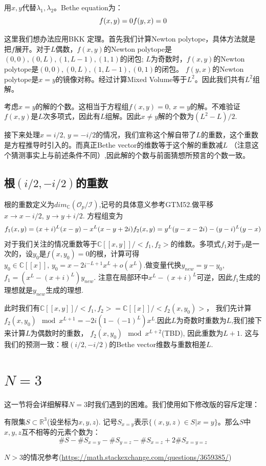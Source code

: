 用$x,y$代替$\lambda_1,\lambda_2$。Bethe equation为：\[f(x,y)=0\\f(y,x)=0\]

这里我们想办法应用BKK 定理。首先我们计算Newton polytope，具体方法就是把$f$展开。对于$L$偶数，$f(x,y)$的Newton polytope是$(0,0),(0,L),(1,L-1),(1,1)$的闭包; $L$为奇数时，$f(x,y)$的Newton polytope是$(0,0),(0,L),(1,L-1),(0,1)$的闭包。
$f(y,x)$的Newton polytope是$x=y$的镜像对称。经过计算Mixed Volume等于$L^2$。因此我们共有$L^2$组解。

考虑$x=y$的解的个数。这相当于方程组$f(x,y)=0,\,x=y$的解。不难验证$f(x,y)$是$L$次多项式，因此有$L$组解。因此$x\not=y$解的个数为$(L^2-L)/2$.

接下来处理$x=i/2,\,y=-i/2$的情况，我们宣称这个解自带了$L$的重数，这个重数是方程推导时引入的。而真正Bethe vector的维数等于这个解的重数减$L$
（注意这个猜测事实上与前述条件不同）,因此解的个数与前面猜想所预言的个数一致。

\subsection{根$(i/2,-i/2)$的重数}
根的重数定义为$dim_{\mathbb{C}}(\mathcal{O}_p/\mathcal{I})$,记号的具体意义参考GTM52.做平移$x\to x-i/2,\,y\to y+i/2$.
方程组变为
\[
    f_1(x,y)=(x+i)^{L}(x-y)-x^{L}(x-y+2i)\\
    f_2(x,y)=y^{L}(y-x-2i)-(y-i)^{L}(y-x)
\]
对于我们关注的情况重数等于$\mathbb{C}[[x,y]]/<f_1,f_2>$的维数。多项式$f_1$对于$y$是一次的，设$y_0$是$f(x,y_0)=0$的根，计算可得
$y_0\in\mathbb{C}[[x]],\,y_0=x-2i^{-L+1}x^L+o(x^L)$.做变量代换$y_{new}= y-y_0$, $f_1=(x^L-(x+i)^L)y_{new}$.
注意在局部环中$x^L-(x+i)^L$可逆，因此$f_1$生成的理想就是$y_{new}$生成的理想.

此时我们有$\mathbb{C}[[x,y]]/<f_1,f_2>=\mathbb{C}[[x]]/<f_2(x,y_0)>$，
我们先计算$f_2(x,y_0) \mod x^{L+1}=-2i(1-(-1)^L)x^L$.因此$L$为奇数时重数为$L$,我们接下来计算$L$为偶数时的重数，
$f_2(x,y_0) \mod x^{L+2}$(TBD), 因此重数为$L+1$. 这与我们的预测一致：根$(i/2,-i/2)$的Bethe vector维数与重数相差$L$.

\section{$N=3$}
这一节将会详细解释$N=3$时我们遇到的困难。我们使用如下修改版的容斥定理：
\begin{theorem}

有限集$S\subset\mathbb{R}^3$(设坐标为$x,y,z$). 记号$S_{x=y}$表示$\{(x,y,z)\in S| x=y\}$。那么$S$中$x,y,z$互不相等的元素个数为：
\[\#S-\#S_{x=y}-\#S_{y=z}-\#S_{x=z}+2\#S_{x=y=z}\]

\end{theorem}
$N>3$的情况参考(\url{https://math.stackexchange.com/questions/3659385/})

